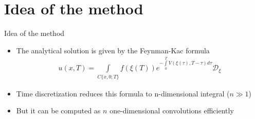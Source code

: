 \documentclass{beamer}
\theoremstyle{definition}
\theoremstyle{plain}
\theoremstyle{remark}
\begin{document}
	\section{Idea of the method}
		\begin{frame}{Idea of the method}
            \begin{itemize}
                \item The analytical solution is given by the Feynman-Kac formula
                \begin{equation}
                    \begin{aligned}
                    \nonumber
                    u(x, T) = \int\limits_{C\{x,0; T\}} f(\xi(T)) e^{-\int\limits_0^T V(\xi(\tau), T - \tau) d\tau} \mathcal D_\xi
                    \end{aligned}
                \end{equation} 
                \pause
                \item Time discretization reduces this formula to n-dimensional integral ($n \gg 1$)
                \pause
                \item But it can be computed as $n$ one-dimensional convolutions efficiently  
            \end{itemize}		
		\end{frame}
		
\end{document}
